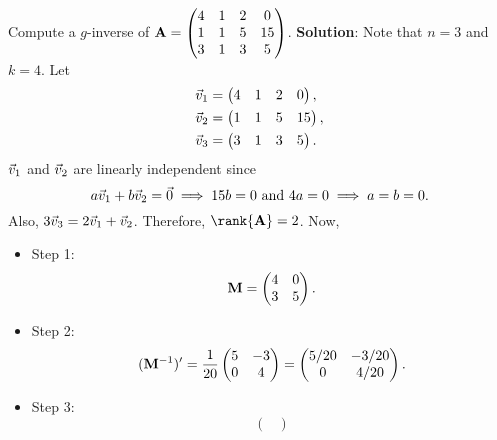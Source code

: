 \begin{Example}{}{}
    Compute a $ g $-inverse of
    $ \mathbf{A}=\begin{pmatrix}
            4 & 1 & 2 & 0  \\
            1 & 1 & 5 & 15 \\
            3 & 1 & 3 & 5
        \end{pmatrix} $.
    \tcblower{}
    \textbf{Solution}: Note that $ n=3 $ and $ k=4 $. Let
    \begin{align*}
        \vec{v}_1 & =\begin{pmatrix}
                            4 & 1 & 2 & 0
                        \end{pmatrix}, \\
        \vec{v}_2 & =\begin{pmatrix}
                            1 & 1 & 5 & 15
                        \end{pmatrix}, \\
        \vec{v}_3 & =\begin{pmatrix}
                            3 & 1 & 3 & 5
                        \end{pmatrix}.
    \end{align*}
    $ \vec{v}_1 $ and $ \vec{v}_2 $
    are linearly independent since
    \[ a \vec{v}_1+b \vec{v}_2=\vec{0}\implies 15b=0\text{ and }4a=0\implies a=b=0. \]
    Also, $ 3 \vec{v}_3=2 \vec{v}_1+\vec{v}_2 $.
    Therefore, $ \rank{\Matrix{A}}=2 $. Now,
    \begin{itemize}
        \item Step 1:
              \[ \mathbf{M}=\begin{pmatrix}
                      4 & 0 \\
                      3 & 5
                  \end{pmatrix}. \]
        \item Step 2:
              \[ (\mathbf{M}^{-1})'=\frac{1}{20}\begin{pmatrix}
                      5 & -3 \\
                      0 & 4
                  \end{pmatrix}=
                  \begin{pmatrix}
                      5/20 & -3/20 \\
                      0    & 4/20
                  \end{pmatrix}. \]
        \item Step 3:
              \[ \begin{pmatrix}

\end{pmatrix}\]
\end{itemize}
\end{Example}
